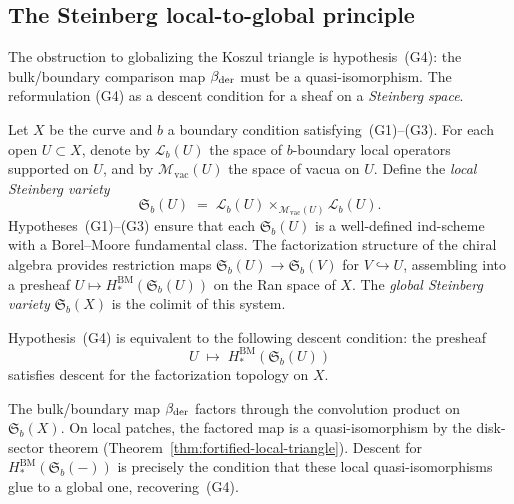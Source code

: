 \subsection{The Steinberg local-to-global principle}

\providecommand{\fS}{\mathfrak{S}}
\providecommand{\cL}{\mathcal{L}}
\providecommand{\Mvac}{\mathcal{M}_{\mathrm{vac}}}

The obstruction to globalizing the Koszul triangle is
hypothesis~(G4): the bulk/boundary comparison map
$\beta_{\mathrm{der}}$ must be a quasi-isomorphism.
The reformulation (G4) as a descent condition
for a sheaf on a \emph{Steinberg space}.

\begin{construction}
Let $X$ be the curve and $b$ a boundary condition
satisfying~(G1)--(G3).
For each open $U\subset X$, denote by
$\cL_b(U)$ the space of $b$-boundary local operators
supported on $U$, and by $\Mvac(U)$ the space of
vacua on $U$. Define the \emph{local Steinberg variety}
\[
\fS_b(U)
\;=\;
\cL_b(U)\times_{\Mvac(U)}\cL_b(U).
\]
Hypotheses~(G1)--(G3) ensure that each
$\fS_b(U)$ is a well-defined ind-scheme
with a Borel--Moore fundamental class.
The factorization structure of the chiral algebra
provides restriction maps
$\fS_b(U)\to\fS_b(V)$ for $V\hookrightarrow U$,
assembling into a presheaf
$U\mapsto H_*^{\mathrm{BM}}(\fS_b(U))$
on the Ran space of $X$.
The \emph{global Steinberg variety}
$\fS_b(X)$ is the colimit of this system.
\end{construction}

\begin{conjecture}[\ClaimStatusConjectured]
Hypothesis~\textup{(G4)} is equivalent to the
following descent condition: the presheaf
\[
U\;\longmapsto\;H_*^{\mathrm{BM}}(\fS_b(U))
\]
satisfies descent for the factorization topology on $X$.
\end{conjecture}

\begin{remark}[Sketch]
The bulk/boundary map $\beta_{\mathrm{der}}$ factors through
the convolution product on $\fS_b(X)$.
On local patches, the factored map is a
quasi-isomorphism by the disk-sector theorem
(Theorem~\ref{thm:fortified-local-triangle}).
Descent for $H_*^{\mathrm{BM}}(\fS_b(-))$
is precisely the condition that these local
quasi-isomorphisms glue to a global one,
recovering~(G4).
\end{remark}

